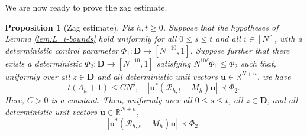 \documentclass[11pt,reqno]{amsart}
\def\R{\mathbb{R}}
\def\u{\mathbf{u}}
\def\cR{\mathcal{R}}
\def\bD{\mathbf{D}}
\newtheorem{proposition}[theorem]{Proposition}
\theoremstyle{definition}
\numberwithin{equation}{section}
\numberwithin{figure}{section}
\begin{document}
We are now ready to prove the zag estimate.
\begin{proposition}[Zag estimate]\label{prop:full-block-zag}
Fix $h,t\geq 0$. Suppose that the hypotheses of Lemma \ref{lem:L_i-bounds} hold uniformly for all $0\leq s\leq t$ and all $i\in[N]$, with a deterministic control parameter $\Phi_1:\bD\rightarrow[N^{-10},1]$. Suppose further that there exists a deterministic $\Phi_2:\bD\rightarrow[N^{-10},1]$ satisfying $N^{10\delta}\Phi_1\leq\Phi_2$ such that, uniformly over all $z\in\bD$ and all deterministic unit vectors $\u\in\R^{N+n}$, we have
\[
    t(\Lambda_h+1)\leq CN^\delta,\quad |\u^*(\cR_{h,t}-M_h)\u|\prec \Phi_2.
\]
Here, $C>0$ is a constant. Then, uniformly over all $0\leq s\leq t$, all $z\in\bD$, and all deterministic unit vectors $\u\in\R^{N+n}$,
\[
    |\u^*(\cR_{h,s}-M_h)\u|\prec \Phi_2.
\]
\end{proposition}
\end{document}
